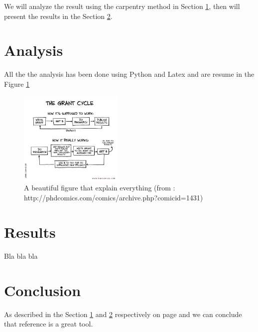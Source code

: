 \documentclass[a4paper]{article}
\begin{document}


\tableofcontents

\newpage

We will analyze the result using the carpentry method in Section \ref{sec:analysis}, then will present the results in the Section \ref{sec:results}.

\section{Analysis}\label{sec:analysis}

All the the analysis has been done using Python and Latex and are resume in the Figure \ref{fig:analysis}

\begin{figure}
\includegraphics[width=5cm]{fig/phd050611s}
\caption{A beautiful figure that explain everything (from : http://phdcomics.com/comics/archive.php?comicid=1431)}
\label{fig:analysis}
\end{figure}

\section{Results}\label{sec:results}

Bla bla bla

\section{Conclusion}\label{sec:conclusion}

As described in the Section \ref{sec:analysis} and \ref{sec:results} respectively on page \pageref{sec:analysis} and \pageref{sec:results} we can conclude that reference is a great tool.
\end{document}
